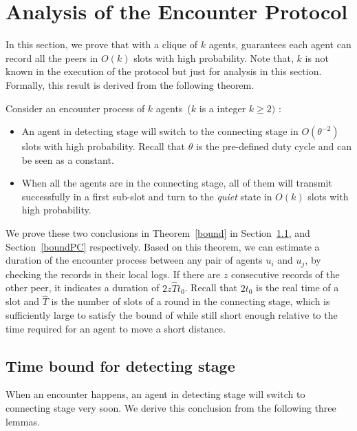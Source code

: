 \section{Analysis of the Encounter Protocol}
\label{sectionanalysis}

In this section, we prove that with a clique of $k$ agents,  
{\pName} guarantees each agent can record all
the peers in $O(k)$ slots with high probability.
Note that, $k$ is not known in the execution of the protocol but just for analysis
in this section.
Formally, this result is derived from the following theorem.
\begin{theorem}
    \label{bound}
    Consider an encounter process of $k$ agents~($k$ is a integer $k \geq 2)$ :
    \begin{itemize} 
    \item[(1)] An agent in detecting stage  will switch to the connecting stage in $O(\theta^{-2})$
    slots with high probability. Recall that $\theta$ is the pre-defined duty cycle and can be seen 
    as a constant.
    \item[(2)] When all the agents are in the connecting stage, all of them will
    transmit successfully in a first sub-slot and turn to the \emph{quiet} state 
    in $O(k)$ slots with high probability.
    \end{itemize}
\end{theorem}

We prove these two conclusions in Theorem~\ref{bound} in Section~\ref{boundSW}, and
Section~\ref{boundPC} respectively. 
Based on this theorem, we can
estimate a duration of the encounter process
between any pair of agents $u_i$ and $u_j$, 
by checking the records in their local logs.  
If there are $z$ consecutive records of the other peer, it indicates a 
duration of $2z\hat{T}t_0$. Recall that $2t_0$ is the real time 
of a slot and $\hat{T}$ is the number of slots of a round in 
the connecting stage, which is 
sufficiently large to satisfy the bound 
of {\pName}  while still short enough relative to the 
time required for an agent to move a short distance. 

\subsection{Time bound for detecting stage}
\label{boundSW}

When an encounter happens, an agent in detecting stage will switch to connecting stage very soon. 
We derive this conclusion from the following three lemmas.

